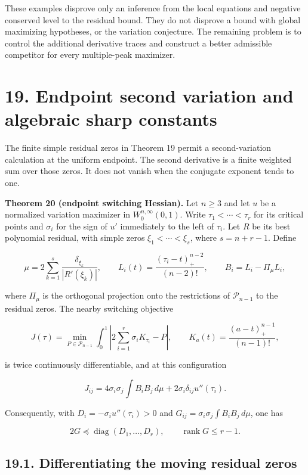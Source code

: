 \documentclass[11pt]{article}
\begin{document}
These examples disprove only an inference from the local equations and
negative conserved level to the residual bound. They do not disprove a
bound with global maximizing hypotheses, or the variation conjecture.
The remaining problem is to control the additional derivative traces and
construct a better admissible competitor for every multiple-peak
maximizer.

\section{19. Endpoint second variation and algebraic sharp
constants}\label{endpoint-second-variation-and-algebraic-sharp-constants}

The finite simple residual zeros in Theorem 19 permit a second-variation
calculation at the uniform endpoint. The second derivative is a finite
weighted sum over those zeros. It does not vanish when the conjugate
exponent tends to one.

\textbf{Theorem 20 (endpoint switching Hessian).} Let \(n\ge3\) and let
\(u\) be a normalized variation maximizer in \(W_0^{n,\infty}(0,1)\).
Write \(\tau_1<\cdots<\tau_r\) for its critical points and \(\sigma_i\)
for the sign of \(u'\) immediately to the left of \(\tau_i\). Let \(R\)
be its best polynomial residual, with simple zeros
\(\xi_1<\cdots<\xi_s\), where \(s=n+r-1\). Define

\[
\mu=2\sum_{k=1}^s\frac{\delta_{\xi_k}}{|R'(\xi_k)|},
\qquad
L_i(t)=\frac{(\tau_i-t)_+^{n-2}}{(n-2)!},
\qquad B_i=L_i-\Pi_\mu L_i,
\tag{19.1}
\]

where \(\Pi_\mu\) is the orthogonal projection onto the restrictions of
\(\mathcal P_{n-1}\) to the residual zeros. The nearby switching
objective

\[
J(\tau)=\min_{P\in\mathcal P_{n-1}}
\int_0^1\left|2\sum_{i=1}^r\sigma_iK_{\tau_i}-P\right|,
\qquad K_a(t)=\frac{(a-t)_+^{n-1}}{(n-1)!},
\tag{19.2}
\]

is twice continuously differentiable, and at this configuration

\[
J_{ij}=4\sigma_i\sigma_j\int B_iB_j\,d\mu
+2\sigma_i\delta_{ij}u''(\tau_i).
\tag{19.3}
\]

Consequently, with \(D_i=-\sigma_i u''(\tau_i)>0\) and
\(G_{ij}=\sigma_i\sigma_j\int B_iB_j\,d\mu\), one has

\[
2G\preceq\operatorname{diag}(D_1,\ldots,D_r),
\qquad \operatorname{rank}G\le r-1.
\tag{19.4}
\]

\subsection{19.1. Differentiating the moving residual
zeros}\label{differentiating-the-moving-residual-zeros}
\end{document}
